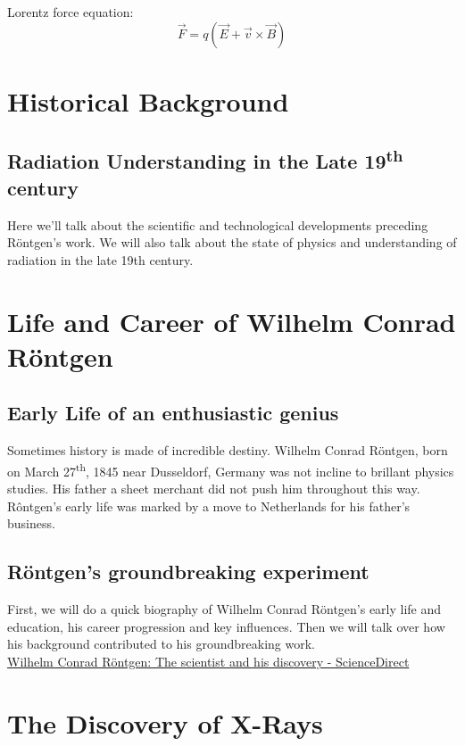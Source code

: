 \documentclass[a4paper,12pt]{report}
\begin{document}
Lorentz force equation:
\begin{equation}
  \vec{F} = q(\vec{E} + \vec{v} \times \vec{B})
\end{equation}






\chapter{Historical Background}
\section{Radiation Understanding in the Late 19\textsuperscript{th} century}
  Here we'll talk about the scientific and technological developments preceding Röntgen's work. We will also talk about the state of physics and understanding of radiation in the late 19th century. 

\chapter{Life and Career of Wilhelm Conrad Röntgen}
\section{Early Life of an enthusiastic genius}
Sometimes history is made of incredible destiny. Wilhelm Conrad Röntgen, born on March 27\textsuperscript{th}, 1845 near Dusseldorf, Germany was not incline to brillant physics studies. 
His father a sheet merchant did not push him throughout this way. Rôntgen's early life was marked by a move to Netherlands for his father's business.
\section{Röntgen's groundbreaking experiment}
First, we will do a quick biography of Wilhelm Conrad Röntgen's early life and education, his career progression and key influences. Then we will talk over how his background contributed to his groundbreaking work.~\\
\href{https://www.sciencedirect.com/science/article/pii/S1120179720302532}{Wilhelm Conrad Röntgen: The scientist and his discovery - ScienceDirect }

\chapter{The Discovery of X-Rays}
\end{document}
